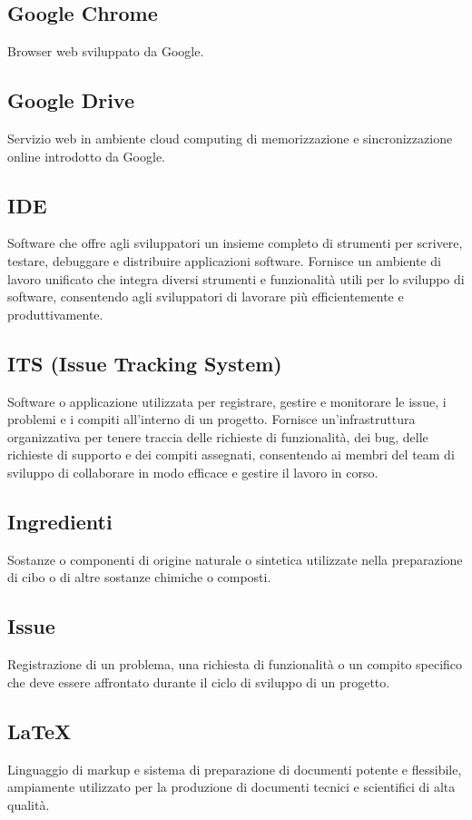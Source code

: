 \subsection{Google Chrome}Browser web sviluppato da Google.
\subsection{Google Drive}Servizio web in ambiente cloud computing di memorizzazione e sincronizzazione online introdotto da Google.
\subsection{IDE}Software che offre agli sviluppatori un insieme completo di strumenti per scrivere, testare, debuggare e distribuire applicazioni software. Fornisce un ambiente di lavoro unificato che integra diversi strumenti e funzionalità utili per lo sviluppo di software, consentendo agli sviluppatori di lavorare più efficientemente e produttivamente.
\subsection{ITS (Issue Tracking System)}Software o applicazione utilizzata per registrare, gestire e monitorare le issue, i problemi e i compiti all'interno di un progetto. Fornisce un'infrastruttura organizzativa per tenere traccia delle richieste di funzionalità, dei bug, delle richieste di supporto e dei compiti assegnati, consentendo ai membri del team di sviluppo di collaborare in modo efficace e gestire il lavoro in corso.
\subsection{Ingredienti}Sostanze o componenti di origine naturale o sintetica utilizzate nella preparazione di cibo o di altre sostanze chimiche o composti.
\subsection{Issue}Registrazione di un problema, una richiesta di funzionalità o un compito specifico che deve essere affrontato durante il ciclo di sviluppo di un progetto.
\subsection{LaTeX}Linguaggio di markup e sistema di preparazione di documenti potente e flessibile, ampiamente utilizzato per la produzione di documenti tecnici e scientifici di alta qualità.
